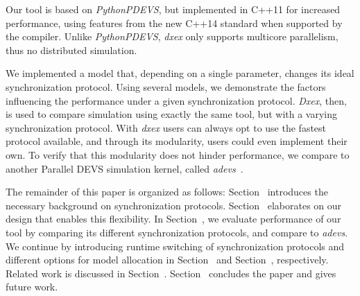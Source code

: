 Our tool is based on \textit{PythonPDEVS}, but implemented in C++11 for increased performance, using features from the new C++14 standard when supported by the compiler.
Unlike \textit{PythonPDEVS}, \textit{dxex} only supports multicore parallelism, thus no distributed simulation.

We implemented a model that, depending on a single parameter, changes its ideal synchronization protocol.
Using several models, we demonstrate the factors influencing the performance under a given synchronization protocol.
\textit{Dxex}, then, is used to compare simulation using exactly the same tool, but with a varying synchronization protocol.
With \textit{dxex} users can always opt to use the fastest protocol available, and through its modularity, users could even implement their own.
To verify that this modularity does not hinder performance, we compare to another \textsf{Parallel DEVS} simulation kernel, called \textit{adevs}~\cite{adevs}.

The remainder of this paper is organized as follows:
Section~\textsc{} introduces the necessary background on synchronization protocols.
Section~\textsc{} elaborates on our design that enables this flexibility.
In Section~\textsc{}, we evaluate performance of our tool by comparing its different synchronization protocols, and compare to \textit{adevs}.
We continue by introducing runtime switching of synchronization protocols and different options for model allocation in Section~\textsc{} and Section~\textsc{}, respectively.
Related work is discussed in Section~\textsc{}.
Section~\textsc{} concludes the paper and gives future work.
